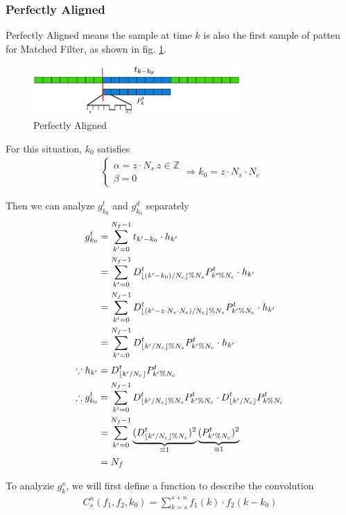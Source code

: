 \documentclass[a4paper]{article}
\begin{document}
\subsubsection{Perfectly Aligned} %
\label{ssub:perfectly_aligned}
Perfectly Aligned means the sample at time $k$ is also the first sample of patten for Matched Filter, as shown in fig. \ref{fig:Perfectly Aligned}.
\begin{figure}[ht]
	\centering
	\includegraphics[width=3.1in]{figure/perfectly_aligned.png}
	\caption{Perfectly Aligned}
	\label{fig:Perfectly Aligned}
\end{figure}
For this situation, $k_0$ satisfies 
\begin{align}
	\begin{cases}
		\alpha = z \cdot N_s ~ z \in \mathbb{Z}\\
		\beta = 0
	\end{cases}
	\Rightarrow
	k_0 = z \cdot N_s \cdot N_c
\end{align}

Then we can analyze $g^t_{k_0}$ and $g^d_{k_0}$ separately
\begin{align}
	g^t_{k_0}
	&= \sum_{k' = 0}^{N_f-1} t_{k'-k_0} \cdot h_{k'}\\
	&= \sum_{k' = 0}^{N_f-1} D^t_{\lfloor(k'-k_0) / N_c\rfloor\%N_s} P^t_{k' \% N_c} \cdot h_{k'}\\
	&= \sum_{k' = 0}^{N_f-1} D^t_{\lfloor(k'-z \cdot N_s \cdot N_c) /N_c\rfloor\% N_s} P^t_{k' \% N_c} \cdot h_{k'}\\
	&= \sum_{k' = 0}^{N_f-1} D^t_{\lfloor k'/N_c\rfloor\%N_s} P^t_{k' \% N_c} \cdot h_{k'}\\
\end{align}
\begin{align}
	\because 
	h_{k'} &= D^t_{\lfloor k'/N_c\rfloor} P^t_{k' \% N_c}\\
	\therefore
	g^t_{k_0}
	&= \sum_{k' = 0}^{N_f-1} D^t_{\lfloor k'/N_c\rfloor\%N_s} P^t_{k' \% N_c} \cdot D^t_{\lfloor k'/N_c\rfloor} P^t_{k \% N_c}\\
	&= \sum_{k' = 0}^{N_f-1} \underbrace{(D^t_{\lfloor k'/N_c\rfloor\%N_s})^2}_{\equiv 1} \underbrace{(P^t_{k' \% N_c})^2}_{\equiv1}\\
	&= N_f
\end{align}

To analyzie $g^s_k$, we will first define a function to describe the convolution
\begin{align}
	C^n_s(f_1, f_2, k_0) = \sum_{k = s}^{s+n} f_1(k)\cdot f_2(k - k_0) \label{eq:New Defined Convolution}
\end{align}
\end{document}
